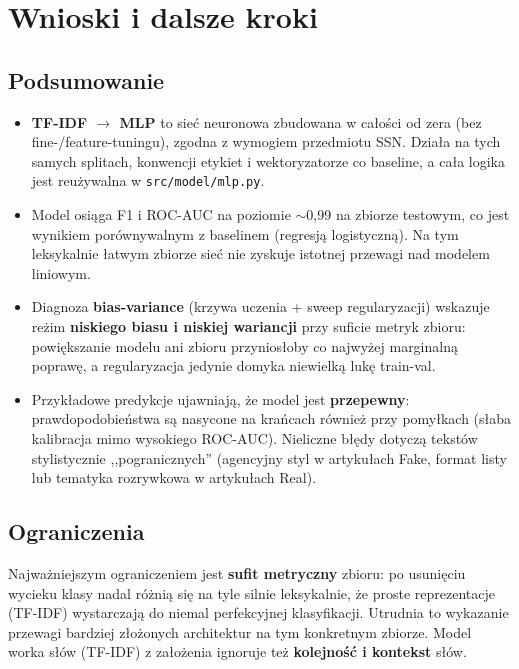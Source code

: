 \section{Wnioski i dalsze kroki}

\subsection{Podsumowanie}

\begin{itemize}[noitemsep]
  \item \textbf{TF-IDF $\rightarrow$ MLP} to sieć neuronowa zbudowana w całości
        od zera (bez fine-/feature-tuningu), zgodna z wymogiem przedmiotu SSN.
        Działa na tych samych splitach, konwencji etykiet i wektoryzatorze co
        baseline, a cała logika jest reużywalna w \texttt{src/model/mlp.py}.
  \item Model osiąga F1 i ROC-AUC na poziomie $\sim$0{,}99 na zbiorze testowym,
        co jest wynikiem porównywalnym z baselinem (regresją logistyczną). Na tym leksykalnie
        łatwym zbiorze sieć nie zyskuje istotnej przewagi nad modelem liniowym.
  \item Diagnoza \textbf{bias-variance} (krzywa uczenia + sweep regularyzacji)
        wskazuje reżim \textbf{niskiego biasu i niskiej wariancji} przy suficie
        metryk zbioru: powiększanie modelu ani zbioru przyniosłoby co najwyżej
        marginalną poprawę, a regularyzacja jedynie domyka niewielką lukę train-val.
  \item Przykładowe predykcje ujawniają, że model jest \textbf{przepewny}:
        prawdopodobieństwa są nasycone na krańcach również przy pomyłkach (słaba
        kalibracja mimo wysokiego ROC-AUC). Nieliczne błędy dotyczą tekstów
        stylistycznie ,,pogranicznych'' (agencyjny styl w artykułach Fake, format
        listy lub tematyka rozrywkowa w artykułach Real).
\end{itemize}

\subsection{Ograniczenia}

Najważniejszym ograniczeniem jest \textbf{sufit metryczny} zbioru: po usunięciu
wycieku klasy nadal różnią się na tyle silnie leksykalnie, że proste reprezentacje
(TF-IDF) wystarczają do niemal perfekcyjnej klasyfikacji. Utrudnia to wykazanie
przewagi bardziej złożonych architektur na tym konkretnym zbiorze. Model
worka słów (TF-IDF) z założenia ignoruje też \textbf{kolejność i kontekst} słów.

